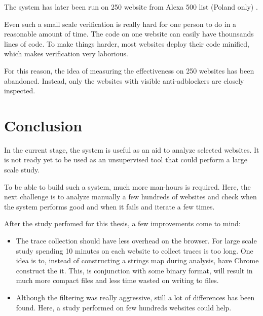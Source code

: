 The system has later been run on 250 website from Alexa 500 list (Poland only) .

Even such a small scale verification is really hard for one person to do in a reasonable amount of time.
The code on one website can easily have thounsands lines of code. To make things harder, 
most websites deploy their code minified, which makes verification very laborious.

For this reason, the idea of measuring the effectiveness on 250 websites has been abandoned.
Instead, only the websites with visible anti-adblockers are closely inspected.


\section{Conclusion}

In the current stage, the system is useful as an aid to analyze selected websites.
It is not ready yet to be used as an unsupervised tool that could perform a large scale study.

To be able to build such a system, much more man-hours is required. Here, the next challenge
is to analyze manually a few hundreds of websites and check when the system performs good 
and when it fails and iterate a few times.

After the study perfomed for this thesis, a few improvements come to mind:
\begin{itemize}
  \item The trace collection should have less overhead on the browser. For large scale study
           spending 10 minutes on each website to collect traces is too long.
           One idea is to, instead of constructing a strings map during analysis, have
           Chrome construct the it. This, is conjunction with some binary format, will
           result in much more compact files and less time wasted on writing to files.
  \item Although the filtering was really aggressive, still a lot of differences has been found.
           Here, a study performed on few hundreds websites could help. 
\end{itemize}

